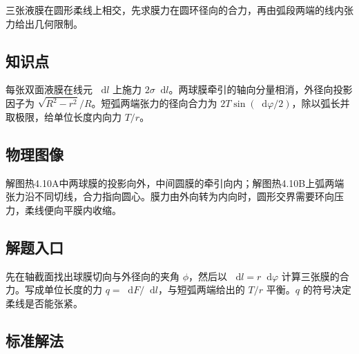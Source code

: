 \documentclass[UTF8,fontset=fandol,a4paper,11pt]{ctexart}
\newcommand{\dd}{\mathop{}\!\mathrm{d}}
\begin{document}
三张液膜在圆形柔线上相交，先求膜力在圆环径向的合力，再由弧段两端的线内张力给出几何限制。



\subsection*{知识点}

每张双面液膜在线元 $\dd l$ 上施力 $2\sigma\dd l$。两球膜牵引的轴向分量相消，外径向投影因子为 $\sqrt{R^2-r^2}/R$。短弧两端张力的径向合力为 $2T\sin(\dd\varphi/2)$，除以弧长并取极限，给单位长度内向力 $T/r$。




\subsection*{物理图像}

解图热4.10A中两球膜的投影向外，中间圆膜的牵引向内；解图热4.10B上弧两端张力沿不同切线，合力指向圆心。膜力由外向转为内向时，圆形交界需要环向压力，柔线便向平膜内收缩。



\subsection*{解题入口}

先在轴截面找出球膜切向与外径向的夹角 $\phi$，然后以 $\dd l=r\dd\varphi$ 计算三张膜的合力。写成单位长度的力 $q=\dd F/\dd l$，与短弧两端给出的 $T/r$ 平衡。$q$ 的符号决定柔线是否能张紧。




\subsection*{标准解法}
\end{document}
